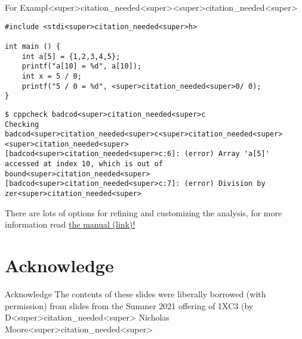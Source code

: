 \documentclass[11pt]{beamer}
\begin{document}
\begin{frame}[fragile=singleslide]{For Exampl<super>citation_needed<super><super>citation_needed<super>}
\begin{lstlisting}[style=C]
#include <stdi<super>citation_needed<super>h>

int main () {
	int a[5] = {1,2,3,4,5};
	printf("a[10] = %d", a[10]);
	int x = 5 / 0;
	printf("5 / 0 = %d", <super>citation_needed<super>0/ 0);
}
\end{lstlisting}
\begin{lstlisting}[style=terminal]
$ cppcheck badcod<super>citation_needed<super>c
Checking badcod<super>citation_needed<super>c<super>citation_needed<super><super>citation_needed<super>
[badcod<super>citation_needed<super>c:6]: (error) Array 'a[5]' accessed at index 10, which is out of bound<super>citation_needed<super>
[badcod<super>citation_needed<super>c:7]: (error) Division by zer<super>citation_needed<super>
\end{lstlisting}
There are lots of options for refining and customizing the analysis, for more information read \href{https://cppchec<super>citation_needed<super>sourceforg<super>citation_needed<super>net/manua<super>citation_needed<super>html}{the manual (link)!}
\end{frame}

\section[Acknowledge]{Acknowledge}
\begin{frame}{Acknowledge}
\center
\vspace{8em}
The contents of these slides were liberally borrowed (with permission) from slides from the Summer 2021 offering of 1XC3 (by D<super>citation_needed<super> Nicholas Moore<super>citation_needed<super>  
\end{frame}


\end{document}
